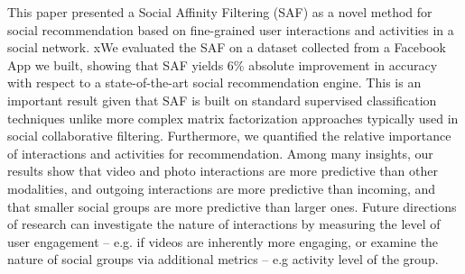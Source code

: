 
This paper presented a Social Affinity Filtering (SAF) as a novel method
for social recommendation based on fine-grained user interactions and
activities in a social network. xWe evaluated the SAF on a dataset collected 
from a Facebook App we built, showing that SAF yields 6\% absolute improvement
in accuracy with respect to a state-of-the-art social recommendation engine.
This is an important result given that SAF is built on standard supervised 
classification techniques unlike more complex matrix factorization approaches
typically used in social collaborative filtering. Furthermore, we
quantified the relative importance of interactions and activities for
recommendation. Among many insights, our results show
that video and photo interactions are more predictive than other
modalities, and outgoing interactions are more predictive than
incoming, and that smaller social groups are more predictive than
larger ones. Future directions of research can investigate the nature
of interactions by measuring the level of user engagement -- e.g. if
videos are inherently more engaging, or examine the nature of social
groups via additional metrics -- e.g activity level of the group.

